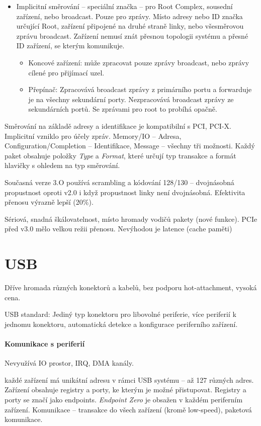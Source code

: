 \documentclass[a4paper, 11pt]{report}
\begin{document}
\begin{itemize}
	\item Implicitní směrování -- speciální značka -- pro Root Complex, sousední zařízení, nebo broadcast. Pouze pro zprávy.
	Místo adresy nebo ID značka určující Root, zařízení připojené na druhé straně linky, nebo všesměrovou zprávu broadcast. Zařízení nemusí znát přesnou topologii systému a přesné ID zařízení, se kterým komunikuje.\\
	\begin{itemize}
		\item Koncové zařízení: může zpracovat pouze zprávy broadcast, nebo zprávy cílené pro přijímací uzel.
		\item Přepínač: Zpracovává broadcast zprávy z primárního portu a forwarduje je na všechny sekundární porty. Nezpracovává broadcast zprávy ze sekundárních portů. Se zprávami pro root to probíhá opačně.
	\end{itemize}
\end{itemize}

Směrování na základě adresy a identifikace je kompatibilní s PCI, PCI-X. Implicitní vzniklo pro účely zpráv. Memory/IO -- Adresa, Configuration/Completion -- Identifikace, Message -- všechny tři možnosti. Každý paket obsahuje položky \emph{Type} a \emph{Format}, které určují typ transakce a formát hlavičky s ohledem na typ směrování.

Současná verze 3.O používá scrambling a kódování 128/130 -- dvojnásobná propustnost oproti v2.0 i když propustnost linky není dvojnásobná. Efektivita přenosu výrazně lepší (20\%).

Sériová, snadná škálovatelnost, místo hromady vodičů pakety (nové funkce). PCIe před v3.0 mělo velkou režii přenosu. Nevýhodou je latence (cache paměti)

\section{USB}
Dříve hromada různých konektorů a kabelů, bez podporu hot-attachment, vysoká cena.

USB standard: Jediný typ konektoru pro libovolné periferie, více periferií k jednomu konektoru, automatická detekce a konfigurace periferního zařízení.

\paragraph{Komunikace s periferií}
Nevyužívá IO prostor, IRQ, DMA kanály.

každé zařízení má unikátní adresu v rámci USB systému -- až 127 různých adres. Zařízení obsahuje registry a porty, ke kterým je možné přistupovat. Registry a porty se značí jako endpoints. \emph{Endpoint Zero} je obsažen v každém periferním zařízení. Komunikace -- transakce do všech zařízení (kromě low-speed), paketová komunikace.
\end{document}
